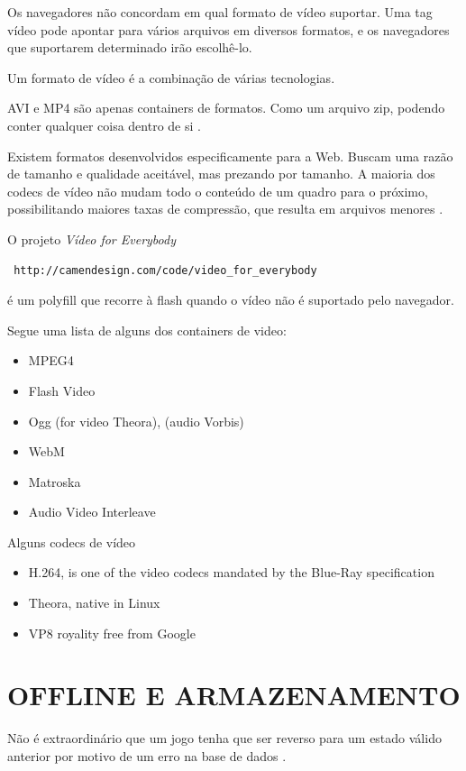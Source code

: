 \documentclass[
12pt,
a4paper,
portuges,
draft
]{report}
\begin{document}
Os navegadores não concordam em qual formato de vídeo suportar.
Uma tag vídeo pode apontar para vários arquivos em diversos formatos, e os navegadores que suportarem determinado irão escolhê-lo.

Um formato de vídeo é a combinação de várias tecnologias.

AVI e MP4 são apenas containers de formatos. Como um arquivo zip, podendo conter qualquer coisa dentro de si \autocite{diveIntohtml}.

Existem formatos desenvolvidos especificamente para a Web. Buscam uma razão de tamanho e qualidade aceitável, mas prezando por tamanho. A maioria dos codecs de vídeo não mudam todo o conteúdo de um quadro para o próximo, possibilitando maiores taxas de compressão, que resulta em arquivos menores \autocite{diveIntohtml}.

O projeto \textit{Vídeo for Everybody} \begin{verbatim} http://camendesign.com/code/video_for_everybody \end{verbatim} é um polyfill que recorre à flash quando o vídeo não é suportado pelo navegador.


Segue uma lista de alguns dos containers de video:
\begin{itemize}
    \item{MPEG4}
    \item{Flash Video}
    \item{Ogg} (for video Theora), (audio Vorbis)
    \item{WebM}
    \item{Matroska}
    \item{Audio Video Interleave}
\end{itemize}

Alguns codecs de vídeo
\begin{itemize}
    \item{H.264, is one of the video codecs mandated by the Blue-Ray specification}
    \item{Theora, native in Linux}
    \item{VP8 royality free from Google}
\end{itemize}


\section{OFFLINE E ARMAZENAMENTO}
Não é extraordinário que um jogo tenha que ser reverso para um estado
válido anterior por motivo de um erro na base de dados \autocite[pp. 5]{browserGamesTechnologyAndFuture}.
\end{document}

